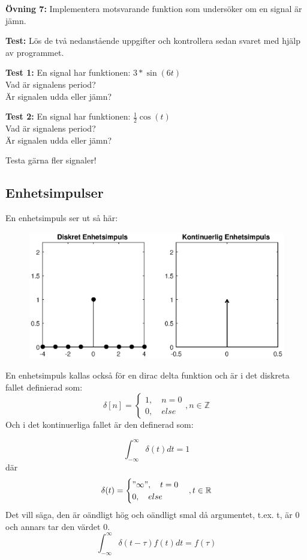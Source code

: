 \documentclass{article}
\begin{document}
\textbf{Övning 7:} Implementera motsvarande funktion som undersöker om en signal är jämn.

\textbf{Test:} Lös de två nedanstående uppgifter och kontrollera sedan svaret med hjälp av programmet. 

\textbf{Test 1:}
En signal har funktionen: $3*\sin(6t)$\\
Vad är signalens period?\\
Är signalen udda eller jämn?

\textbf{Test 2:}
En signal har funktionen: $\frac{1}{2} \cos(t)$\\
Vad är signalens period?\\
Är signalen udda eller jämn?

Testa gärna fler signaler!

\subsection{Enhetsimpulser}
En enhetsimpuls ser ut så här:


\begin{figure}[ht]
\centerline{\includegraphics[scale=0.50]{delta.eps}} 

\caption{}
\label{}
\end{figure}

En enhetsimpuls kallas också för en dirac delta funktion och är i det diskreta fallet definierad som: 
$$
\delta[n]=
\begin{cases}
    1,\quad n = 0 \\
    0, \quad else
\end{cases}, n \in \mathbb{Z}
$$
Och i det kontinuerliga fallet är den definerad som:

$$\int_{-\infty}^{\infty} \delta(t) dt = 1 $$
där
$$
\delta(t)=
\begin{cases}
"\infty",\quad t = 0 \\
0, \quad else
\end{cases}, t\in \mathbb{R}
$$
Det vill säga, den är oändligt hög och oändligt smal då argumentet, t.ex. t, är 0 och annars tar den värdet 0.
$$\int_{-\infty}^{\infty} \delta(t-\tau) f(t) dt = f(\tau) $$
\end{document}
